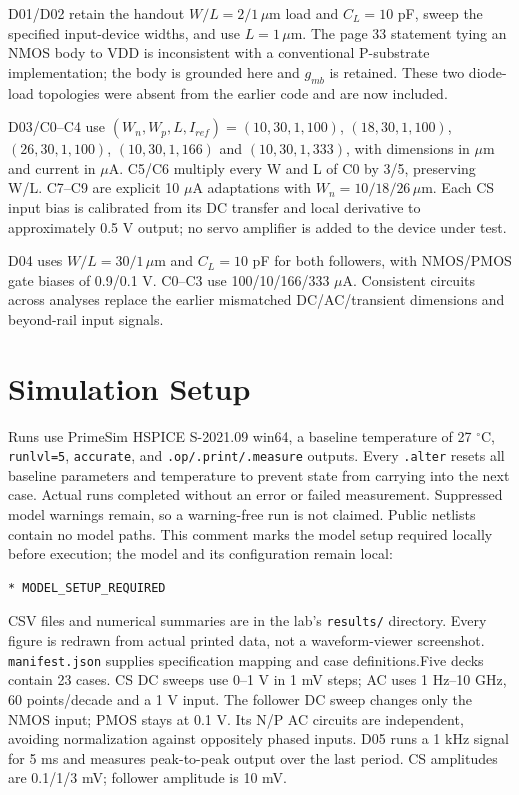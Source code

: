 D01/D02 retain the handout $W/L=2/1\,\mu$m load and $C_L=10$ pF, sweep the specified input-device widths, and use $L=1\,\mu$m. The page 33 statement tying an NMOS body to VDD is inconsistent with a conventional P-substrate implementation; the body is grounded here and $g_{mb}$ is retained. These two diode-load topologies were absent from the earlier code and are now included.

D03/C0--C4 use $(W_n,W_p,L,I_{ref})=(10,30,1,100)$, $(18,30,1,100)$, $(26,30,1,100)$, $(10,30,1,166)$ and $(10,30,1,333)$, with dimensions in $\mu$m and current in $\mu$A. C5/C6 multiply every W and L of C0 by 3/5, preserving W/L. C7--C9 are explicit 10 $\mu$A adaptations with $W_n=10/18/26\,\mu$m. Each CS input bias is calibrated from its DC transfer and local derivative to approximately 0.5 V output; no servo amplifier is added to the device under test.

D04 uses $W/L=30/1\,\mu$m and $C_L=10$ pF for both followers, with NMOS/PMOS gate biases of 0.9/0.1 V. C0--C3 use 100/10/166/333 $\mu$A. Consistent circuits across analyses replace the earlier mismatched DC/AC/transient dimensions and beyond-rail input signals.

\section{Simulation Setup}
Runs use PrimeSim HSPICE S-2021.09 win64, a baseline temperature of 27 $^\circ$C, \texttt{runlvl=5}, \texttt{accurate}, and \texttt{.op/.print/.measure} outputs. Every \texttt{.alter} resets all baseline parameters and temperature to prevent state from carrying into the next case. Actual runs completed without an error or failed measurement. Suppressed model warnings remain, so a warning-free run is not claimed. Public netlists contain no model paths. This comment marks the model setup required locally before execution; the model and its configuration remain local:
\begin{verbatim}
* MODEL_SETUP_REQUIRED
\end{verbatim}
CSV files and numerical summaries are in the lab's \texttt{results/} directory. Every figure is redrawn from actual printed data, not a waveform-viewer screenshot. \texttt{manifest.json} supplies specification mapping and case definitions.Five decks contain 23 cases. CS DC sweeps use 0--1 V in 1 mV steps; AC uses 1 Hz--10 GHz, 60 points/decade and a 1 V input. The follower DC sweep changes only the NMOS input; PMOS stays at 0.1 V. Its N/P AC circuits are independent, avoiding normalization against oppositely phased inputs. D05 runs a 1 kHz signal for 5 ms and measures peak-to-peak output over the last period. CS amplitudes are 0.1/1/3 mV; follower amplitude is 10 mV.

